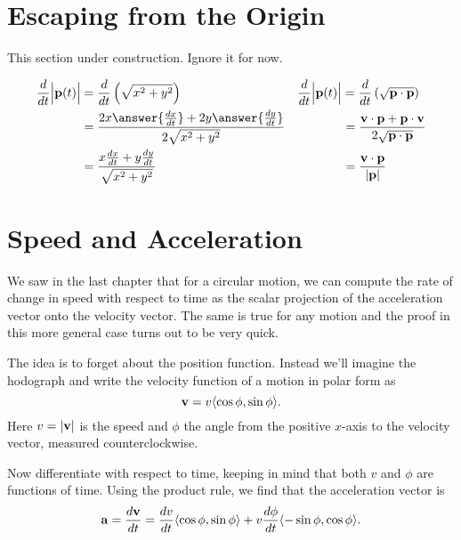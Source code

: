 \documentclass{ximera}
\begin{document}
\section{Escaping from the Origin} 
This section under construction. Ignore it for now.

\begin{question}  \label{QErerttg}
\begin{align*}
\frac{d}{dt}\Big| {\bf p}(t)  \Big| &=  \frac{d}{dt} \left(\sqrt{x^2+y^2}\right)    &&   \frac{d}{dt}\Big| {\bf p}(t)  \Big| = \frac{d}{dt} \left(  \sqrt{{\bf p} \cdot {\bf p}} \right) \\
 &= \frac{2x \answer{\frac{dx}{dt}} + 2y \answer{\frac{dy}{dt}}}{2\sqrt{x^2 + y^2}}  && \hskip 0.5 in = \frac{{\bf v}\cdot {\bf p} + {\bf p}\cdot {\bf v}}{2\sqrt{{\bf p}\cdot {\bf p}}} \\
&= \frac{x \frac{dx}{dt} + y \frac{dy}{dt}}{\sqrt{x^2+y^2}}  &&  \hskip 0.5 in = \frac{{\bf v}\cdot {\bf p}}{|{\bf p}|} 
\end{align*}
\end{question}



\section{Speed and Acceleration}
We saw in the last chapter that for a circular motion, we can compute the rate of change in speed with respect to time as the scalar projection of the acceleration vector onto the velocity vector. The same is true for any motion and the proof in this more general case turns out to be very quick.

The idea is to forget about the position function. Instead we'll imagine the hodograph and write the velocity function of a motion
in polar form as
\[
    {\bf v} = v \langle \cos \phi, \sin \phi \rangle .
\]
Here $v = | {\bf v}|$ is the speed and $\phi$ the angle from the positive $x$-axis to the velocity vector, measured counterclockwise. 

Now differentiate with respect to time, keeping in mind that both $v$ and $\phi$ are functions of time. Using the product rule, we find that the acceleration vector is
\[
    {\bf a} = \frac{d{\bf v}}{dt} = \frac{dv}{dt} \langle \cos\phi, \sin\phi \rangle + v \frac{d\phi}{dt} \langle -\sin\phi, \cos \phi \rangle .
\] 
\end{document}
